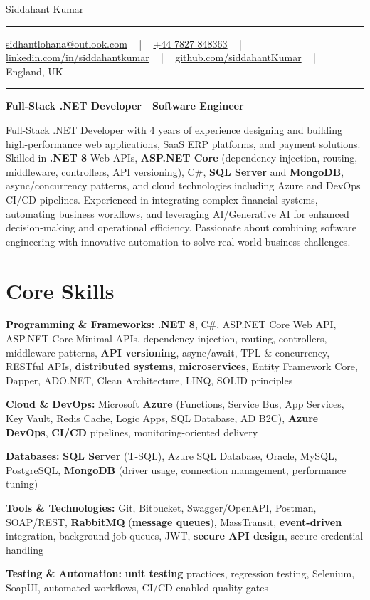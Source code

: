\documentclass[letterpaper,10pt]{article}
\newcommand{\documentTitle}[2]{
  \begin{center}
    \vspace*{-0.3in}
    {\Huge\color{accentTitle} #1}
    \vspace{8pt}
    {\color{accentLine} \hrule}
    \vspace{2pt}
    \footnotesize{#2}
    \vspace{2pt}
    {\color{accentLine} \hrule}
  \end{center}
}
\newenvironment{resume_list}{
  \vspace{-7pt}
  \begin{itemize}[itemsep=-2px, parsep=1pt, leftmargin=30pt]
}{
  \end{itemize}
}
\begin{document}
\documentTitle{Siddahant Kumar}{
\vspace{0.1cm}
\href{mailto:sidhantlohana@outlook.com}{sidhantlohana@outlook.com} ~ | ~
\href{tel:+447827848363}{+44 7827 848363} ~ | ~
\href{https://www.linkedin.com/in/siddahantkumar/}{linkedin.com/in/siddahantkumar} ~ | ~
\href{https://github.com/siddahantKumar}{github.com/siddahantKumar} ~ | ~
England, UK
}

\begin{center}
\textbf{Full-Stack .NET Developer | Software Engineer}
\end{center}

Full-Stack .NET Developer with 4 years of experience designing and building high-performance web applications, SaaS ERP platforms, and payment solutions. Skilled in \textbf{.NET 8} Web APIs, \textbf{ASP.NET Core} (dependency injection, routing, middleware, controllers, API versioning), C\#, \textbf{SQL Server} and \textbf{MongoDB}, async/concurrency patterns, and cloud technologies including Azure and DevOps CI/CD pipelines. Experienced in integrating complex financial systems, automating business workflows, and leveraging AI/Generative AI for enhanced decision-making and operational efficiency. Passionate about combining software engineering with innovative automation to solve real-world business challenges.


\section{Core Skills}

\begin{resume_list}
    \item \textbf{Programming \& Frameworks:} \textbf{.NET 8}, C\#, ASP.NET Core Web API, ASP.NET Core Minimal APIs, dependency injection, routing, controllers, middleware patterns, \textbf{API versioning}, async/await, TPL \& concurrency, RESTful APIs, \textbf{distributed systems}, \textbf{microservices}, Entity Framework Core, Dapper, ADO.NET, Clean Architecture, LINQ, SOLID principles
    \item \textbf{Cloud \& DevOps:} Microsoft \textbf{Azure} (Functions, Service Bus, App Services, Key Vault, Redis Cache, Logic Apps, SQL Database, AD B2C), \textbf{Azure DevOps}, \textbf{CI/CD} pipelines, monitoring-oriented delivery
    \item \textbf{Databases:} \textbf{SQL Server} (T-SQL), Azure SQL Database, Oracle, MySQL, PostgreSQL, \textbf{MongoDB} (driver usage, connection management, performance tuning)
    \item \textbf{Tools \& Technologies:} Git, Bitbucket, Swagger/OpenAPI, Postman, SOAP/REST, \textbf{RabbitMQ} (\textbf{message queues}), MassTransit, \textbf{event-driven} integration, background job queues, JWT, \textbf{secure API design}, secure credential handling
    \item \textbf{Testing \& Automation:} \textbf{unit testing} practices, regression testing, Selenium, SoapUI, automated workflows, CI/CD-enabled quality gates
\end{resume_list}
\end{document}
